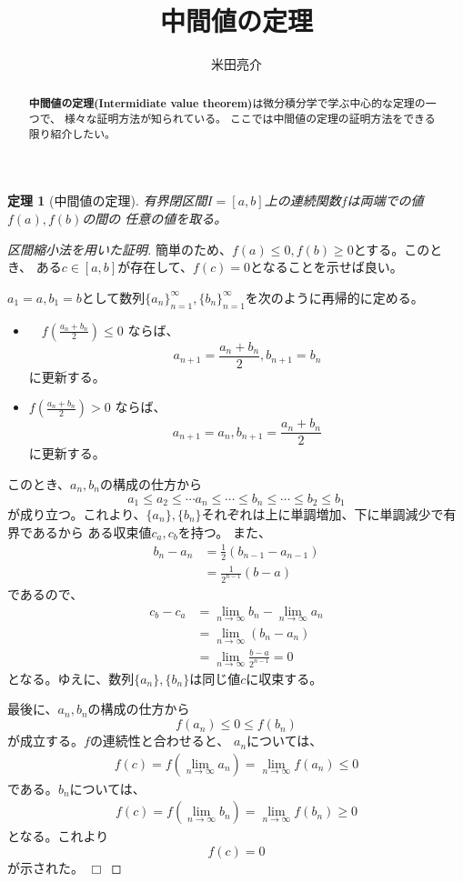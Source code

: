 \documentclass{jsarticle}
\newtheorem{theorem}{定理}
\newtheorem{proof}{証明}
\def\qed{\hfill $\Box$}
\begin{document}
\title{中間値の定理}
\author{米田亮介}
\maketitle	

\begin{abstract}
\textbf{中間値の定理(Intermidiate value theorem)}は微分積分学で学ぶ中心的な定理の一つで、
様々な証明方法が知られている。
ここでは中間値の定理の証明方法をできる限り紹介したい。
\end{abstract}

\begin{theorem}[中間値の定理]
有界閉区間$I=[a,b]$上の連続関数$f$は両端での値$f(a),f(b)$の間の
任意の値を取る。
\end{theorem}

\begin{proof}[区間縮小法を用いた証明]
簡単のため、$f(a)\leq 0,f(b)\geq 0$とする。このとき、
ある$c\in[a,b]$が存在して、$f(c)=0$となることを示せば良い。

$a_{1}=a,b_{1}=b$として数列$\{a_{n}\}_{n=1}^{\infty},\{b_{n}\}_{n=1}^{\infty}$を次のように再帰的に定める。
\begin{itemize}
\item　$f\left(\frac{a_{n}+b_{n}}{2}\right)\leq0$
ならば、\[
a_{n+1}=\frac{a_{n}+b_{n}}{2},b_{n+1}=b_{n}
\]
に更新する。
\item $f\left(\frac{a_{n}+b_{n}}{2}\right)>0$
ならば、\[
a_{n+1}=a_{n},b_{n+1}=\frac{a_{n}+b_{n}}{2}
\]
に更新する。
\end{itemize}
このとき、$a_{n},b_{n}$の構成の仕方から
\[
a_{1}\leq a_{2}\leq\cdots a_{n}\leq\cdots\leq b_{n}\leq\cdots\leq b_{2}\leq b_{1}
\]
が成り立つ。これより、$\{a_{n}\},\{b_{n}\}$それぞれは上に単調増加、下に単調減少で有界であるから
ある収束値$c_{a},c_{b}$を持つ。
また、
\begin{align*}
b_{n}-a_{n}&=\frac{1}{2}(b_{n-1}-a_{n-1})\\
&=\frac{1}{2^{n-1}}(b-a)
\end{align*}
であるので、
\begin{align*}
c_{b}-c_{a}&=\lim_{n\to\infty}b_{n}-\lim_{n\to\infty}a_{n}\\
&=\lim_{n\to\infty}(b_{n}-a_{n})\\
&=\lim_{n\to\infty}\frac{b-a}{2^{n-1}}=0
\end{align*}
となる。ゆえに、数列$\{a_{n}\},\{b_{n}\}$は同じ値$c$に収束する。

最後に、$a_{n},b_{n}$の構成の仕方から\[
f(a_{n})\leq0\leq f(b_{n})
\]
が成立する。$f$の連続性と合わせると、
$a_{n}$については、
\begin{align*}
f(c)=f\left(\lim_{n\to\infty}a_{n}\right)=\lim_{n\to\infty}f(a_{n})\leq0
\end{align*}
である。$b_{n}$については、
\begin{align*}
f(c)=f\left(\lim_{n\to\infty}b_{n}\right)=\lim_{n\to\infty}f(b_{n})\geq0
\end{align*}
となる。これより\[
f(c)=0
\]
が示された。
\qed\end{proof}
\end{document}
